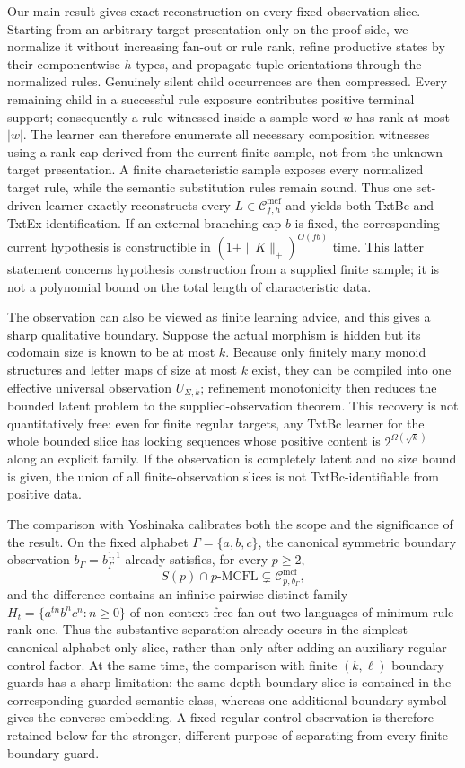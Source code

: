 \documentclass[11pt,a4paper]{article}
\numberwithin{equation}{section}
\theoremstyle{plain}
\theoremstyle{definition}
\theoremstyle{remark}
\newcommand{\Cmcf}[2]{\mathcal{C}^{\mathrm{mcf}}_{#1,#2}}
\begin{document}
Our main result gives exact reconstruction on every fixed observation slice.
Starting from an arbitrary target presentation only on the proof side, we
normalize it without increasing fan-out or rule rank, refine productive states
by their componentwise $h$-types, and propagate tuple orientations through the
normalized rules.  Genuinely silent child occurrences are then compressed.
Every remaining child in a successful rule exposure contributes positive
terminal support; consequently a rule witnessed inside a sample word $w$ has
rank at most $|w|$.  The learner can therefore enumerate all necessary
composition witnesses using a rank cap derived from the current finite sample,
not from the unknown target presentation.  A finite characteristic sample
exposes every normalized target rule, while the semantic substitution rules
remain sound.  Thus one set-driven learner exactly reconstructs every
$L\in\Cmcf{f}{h}$ and yields both TxtBc and TxtEx identification.  If an
external branching cap $b$ is fixed, the corresponding current hypothesis is
constructible in $(1+\|K\|_+)^{O(fb)}$ time.  This latter statement concerns
hypothesis construction from a supplied finite sample; it is not a polynomial
bound on the total length of characteristic data.

The observation can also be viewed as finite learning advice, and this gives a
sharp qualitative boundary.  Suppose the actual morphism is hidden but its
codomain size is known to be at most $k$.  Because only finitely many monoid
structures and letter maps of size at most $k$ exist, they can be compiled into
one effective universal observation $U_{\Sigma,k}$; refinement monotonicity
then reduces the bounded latent problem to the supplied-observation theorem.
This recovery is not quantitatively free: even for finite regular targets,
any TxtBc learner for the whole bounded slice has locking sequences whose
positive content is $2^{\Omega(\sqrt{k})}$ along an explicit family.  If the
observation is completely latent and no size bound is given, the union of all
finite-observation slices is not TxtBc-identifiable from positive data.

The comparison with Yoshinaka calibrates both the scope and the significance
of the result.  On the fixed alphabet $\Gamma=\{a,b,c\}$, the canonical
symmetric boundary observation $b_\Gamma=b_\Gamma^{1,1}$ already satisfies,
for every $p\ge2$,
\[
  S(p)\cap p\text{-}\mathrm{MCFL}
  \subsetneq
  \Cmcf{p}{b_\Gamma},
\]
and the difference contains an infinite pairwise distinct family
$H_t=\{a^{tn}b^nc^n:n\ge0\}$ of non-context-free fan-out-two languages of
minimum rule rank one.  Thus the substantive separation already occurs in the
simplest canonical alphabet-only slice, rather than only after adding an
auxiliary regular-control factor.  At the same time, the comparison with
finite $(k,\ell)$ boundary guards has a sharp limitation: the same-depth
boundary slice is contained in the corresponding guarded semantic class,
whereas one additional boundary symbol gives the converse embedding.  A fixed
regular-control observation is therefore retained below for the stronger,
different purpose of separating from every finite boundary guard.
\end{document}

